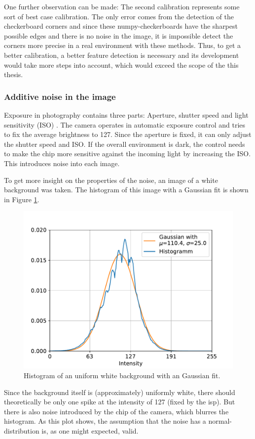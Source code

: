 One further observation can be made: The second calibration represents some sort of best case calibration.
The only error comes from the detection of the checkerboard corners and since these numpy-checkerboards have the sharpest possible edges and there is no noise in the image, it is impossible detect the corners more precise in a real environment with these methods.
Thus, to get a better calibration, a better feature detection is necessary and its development would take more steps into account, which would exceed the scope of the this thesis.

\subsubsection{Additive noise in the image} 
Exposure in photography contains three parts: Aperture, shutter speed and light sensitivity (ISO) \cite{exposure}.
The camera operates in automatic exposure control and tries to fix the average brightness to 127.
Since the aperture is fixed, it can only adjust the shutter speed and ISO.
If the overall environment is dark, the control needs to make the chip more sensitive against the incoming light by increasing the ISO.
This introduces noise into each image.

To get more insight on the properties of the noise, an image of a white background was taken.
The histogram of this image with a Gaussian fit is shown in Figure \ref{development:noise_dist}.
\begin{figure}
	\centering
	\includegraphics[width=0.9\linewidth]{3-development/calibration/images/noise_distribution.pdf}
	\caption{Histogram of an uniform white background with an Gaussian fit.\label{development:noise_dist}}
\end{figure}
Since the background itself is (approximately) uniformly white, there should theoretically be only one spike at the intensity of 127 (fixed by the \acs{isp}).
But there is also noise introduced by the chip of the camera, which blurres the histogram.
As this plot shows, the assumption that the noise has a normal-distribution is, as one might expected, valid.

